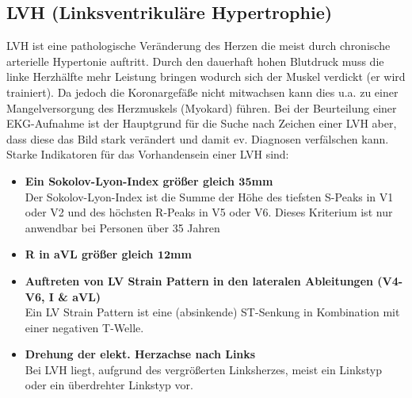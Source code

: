 \subsection{LVH (Linksventrikuläre Hypertrophie)}
LVH ist eine pathologische Veränderung des Herzen die meist durch chronische arterielle Hypertonie auftritt. Durch den dauerhaft hohen Blutdruck muss die linke Herzhälfte mehr Leistung bringen wodurch sich der Muskel verdickt (er wird trainiert). Da jedoch die Koronargefäße nicht mitwachsen kann dies u.a. zu einer Mangelversorgung des Herzmuskels (Myokard) führen. Bei der Beurteilung einer EKG-Aufnahme ist der Hauptgrund für die Suche nach Zeichen einer LVH aber, dass diese das Bild stark verändert und damit ev. Diagnosen verfälschen kann. Starke Indikatoren für das Vorhandensein einer LVH  sind:
\begin{itemize}
	\item \textbf{Ein Sokolov-Lyon-Index größer gleich $\mathbf{35}$mm}\\
	Der Sokolov-Lyon-Index ist die Summe der Höhe des tiefsten S-Peaks in V1 oder V2 und des höchsten R-Peaks in V5 oder V6. Dieses Kriterium ist nur anwendbar bei Personen über 35 Jahren
	
	\item \textbf{R in aVL größer gleich $\mathbf{12}$mm}
	
	\item \textbf{Auftreten von LV Strain Pattern in den lateralen Ableitungen (V4-V6, I \& aVL)}\\
	Ein LV Strain Pattern ist eine (absinkende) ST-Senkung in Kombination mit einer negativen T-Welle.
	
	\item \textbf{Drehung der elekt. Herzachse nach Links}\\
	Bei LVH liegt, aufgrund des vergrößerten Linksherzes, meist ein Linkstyp oder ein überdrehter Linkstyp vor.
\end{itemize}

